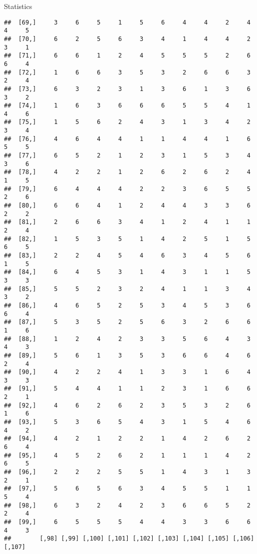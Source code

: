 \documentclass[
  ignorenonframetext,
]{beamer}
\begin{document}
\begin{frame}[fragile]{Statistics}
\begin{verbatim}
##  [69,]     3     6     5     1     5     6     4     4     2     4     4     5
##  [70,]     6     2     5     6     3     4     1     4     4     2     3     1
##  [71,]     6     6     1     2     4     5     5     5     2     6     6     4
##  [72,]     1     6     6     3     5     3     2     6     6     3     2     4
##  [73,]     6     3     2     3     1     3     6     1     3     6     3     2
##  [74,]     1     6     3     6     6     6     5     5     4     1     4     6
##  [75,]     1     5     6     2     4     3     1     3     4     2     3     4
##  [76,]     4     6     4     4     1     1     4     4     1     6     5     5
##  [77,]     6     5     2     1     2     3     1     5     3     4     3     6
##  [78,]     4     2     2     1     2     6     2     6     2     4     1     5
##  [79,]     6     4     4     4     2     2     3     6     5     5     2     6
##  [80,]     6     6     4     1     2     4     4     3     3     6     2     2
##  [81,]     2     6     6     3     4     1     2     4     1     1     2     4
##  [82,]     1     5     3     5     1     4     2     5     1     5     6     5
##  [83,]     2     2     4     5     4     6     3     4     5     6     1     5
##  [84,]     6     4     5     3     1     4     3     1     1     5     3     3
##  [85,]     5     5     2     3     2     4     1     1     3     4     3     2
##  [86,]     4     6     5     2     5     3     4     5     3     6     6     4
##  [87,]     5     3     5     2     5     6     3     2     6     6     1     6
##  [88,]     1     2     4     2     3     3     5     6     4     3     4     3
##  [89,]     5     6     1     3     5     3     6     6     4     6     2     4
##  [90,]     4     2     2     4     1     3     3     1     6     4     3     3
##  [91,]     5     4     4     1     1     2     3     1     6     6     2     1
##  [92,]     4     6     2     6     2     3     5     3     2     6     1     6
##  [93,]     5     3     6     5     4     3     1     5     4     6     4     2
##  [94,]     4     2     1     2     2     1     4     2     6     2     6     4
##  [95,]     4     5     2     6     2     1     1     1     4     2     6     5
##  [96,]     2     2     2     5     5     1     4     3     1     3     2     1
##  [97,]     5     6     5     6     3     4     5     5     1     1     5     4
##  [98,]     6     3     2     4     2     3     6     6     5     2     2     4
##  [99,]     6     5     5     5     4     4     3     3     6     6     4     3
##        [,98] [,99] [,100] [,101] [,102] [,103] [,104] [,105] [,106] [,107]

\end{verbatim}
\end{frame}
\end{document}

